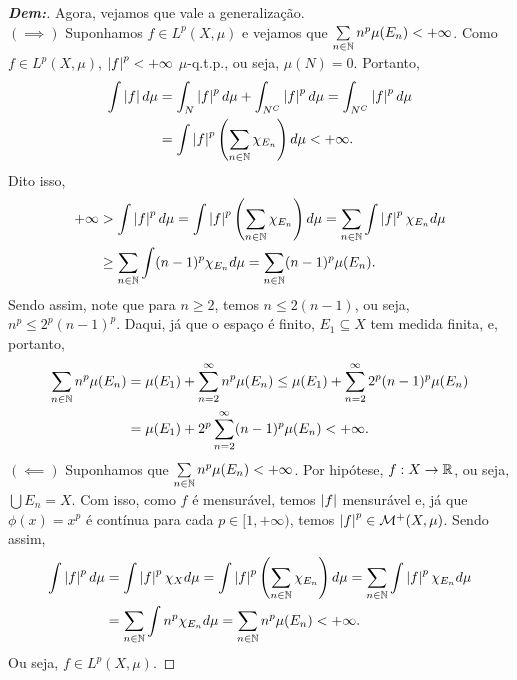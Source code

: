 \begin{proof}[\textbf{Dem:}]
  Agora, vejamos que vale a generalização. \\
  $(\implies)$ Suponhamos $f \in L^p(X, \mu)$ e vejamos que 
  $\sum\limits_{n \in \mathbb N} n^p \mu(E_n) < +\infty$. Como $f \in L^p(X, \mu)$, 
  $\left|f\right|^p < +\infty$ $\mu$-q.t.p., ou seja, $\mu(N) = 0$. Portanto,
  \begin{align*}
    \int \left|f\right| d\mu &= \int_{N} \left|f\right|^p d\mu + \int_{N^C} \left|f\right|^p d\mu 
    = \int_{N^C} \left|f\right|^p d\mu\\ 
    &= \int \left|f\right|^p \left(\sum_{n \in \mathbb N} \chi_{E_n}\right) d\mu < +\infty.
  \end{align*}
  Dito isso, 
  \begin{align*}
    +\infty &>\int \left|f\right|^p d\mu = 
    \int \left|f\right|^p \left(\sum_{n \in \mathbb N} \chi_{E_n}\right) d\mu 
    = \sum_{n \in \mathbb N} \int \left|f\right|^p\chi_{E_n} d\mu\\ 
    &\ge \sum_{n \in \mathbb N} \int (n-1)^p \chi_{E_n}d\mu = \sum_{n \in \mathbb N} (n-1)^p \mu(E_n).
  \end{align*}
  Sendo assim, note que para $n \ge 2$, temos $n \le 2(n-1)$, ou seja, $n^p \le 2^p(n-1)^p$. 
  Daqui, já que o espaço é finito, $E_1 \subseteq X$ tem medida finita, e, portanto,
  \begin{align*}
    \sum_{n \in \mathbb N} n^p\mu(E_n) &= \mu(E_1) + \sum_{n = 2}^\infty n^p\mu(E_n)
    \le \mu(E_1) + \sum_{n = 2}^\infty 2^p(n-1)^p \mu(E_n)\\ 
    &= \mu(E_1) + 2^p \sum_{n = 2}^\infty (n-1)^p \mu(E_n) < +\infty.
  \end{align*}
  $(\impliedby)$ Suponhamos que $\sum\limits_{n \in \mathbb N} n^p \mu(E_n) < +\infty$. 
  Por hipótese, $f: X \rightarrow \mathbb R$, ou seja, $\bigcup E_n = X$. Com isso, 
  como $f$ é mensurável, temos $\left|f\right|$ mensurável e, já que $\phi(x) = x^p$ é 
  contínua para cada $p \in [1, +\infty)$, temos $\left|f\right|^p \in \mathcal M^+(X, \mu)$. 
  Sendo assim, 
  \begin{align*}
    \int \left|f\right|^p d\mu &= \int \left|f\right|^p \chi_{X} d\mu 
    = \int \left|f\right|^p \left(\sum_{n \in \mathbb N} \chi_{E_n}\right) d\mu 
    = \sum_{n \in \mathbb N} \int \left|f\right|^p \chi_{E_n} d\mu \\
    &= \sum_{n \in \mathbb N} \int n^p \chi_{E_n} d\mu = \sum_{n \in \mathbb N} n^p \mu(E_n)<+\infty. 
  \end{align*}
  Ou seja, $f \in L^p(X, \mu)$.
\end{proof}

